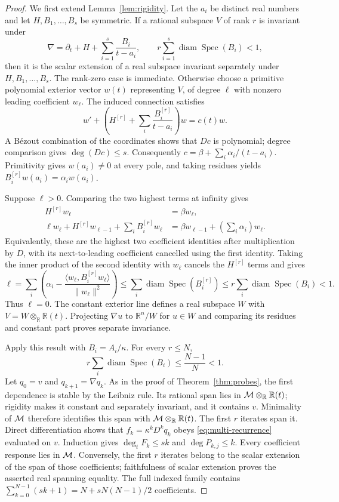 \documentclass[11pt,letterpaper]{article}
\theoremstyle{definition}\newtheorem{definition}[theorem]{Definition}
\theoremstyle{remark}\newtheorem{remark}[theorem]{Remark}
\DeclareMathOperator{\diam}{diam}\DeclareMathOperator{\Spec}{Spec}
\newcommand{\R}{\mathbb R}\newcommand{\Q}{\mathbb Q}\newcommand{\Z}{\mathbb Z}
\begin{document}
\begin{proof}
We first extend Lemma~\ref{lem:rigidity}. Let the $a_i$ be distinct real
numbers and let $H,B_1,\ldots,B_s$ be symmetric. If a rational subspace
$V$ of rank $r$ is invariant under
\[
\nabla=\partial_t+H+\sum_{i=1}^s\frac{B_i}{t-a_i},
\qquad r\sum_{i=1}^s\diam\Spec(B_i)<1,
\]
then it is the scalar extension of a real subspace invariant separately
under $H,B_1,\ldots,B_s$. The rank-zero case is immediate. Otherwise choose
a primitive polynomial exterior vector $w(t)$ representing $V$, of degree
$\ell$ with nonzero leading coefficient $w_\ell$. The induced connection
satisfies
\[
w'+\left(H^{[r]}+\sum_i\frac{B_i^{[r]}}{t-a_i}\right)w=c(t)w.
\]
A B\'ezout combination of the coordinates shows that $Dc$ is polynomial;
degree comparison gives $\deg(Dc)\le s$. Consequently
$c=\beta+\sum_i\alpha_i/(t-a_i)$. Primitivity gives $w(a_i)\ne0$ at every
pole, and taking residues yields
$B_i^{[r]}w(a_i)=\alpha_iw(a_i)$.

Suppose $\ell>0$. Comparing the two highest terms at infinity gives
\[
\begin{aligned}
H^{[r]}w_\ell&=\beta w_\ell,\\
\ell w_\ell+H^{[r]}w_{\ell-1}+\sum_iB_i^{[r]}w_\ell
 &=\beta w_{\ell-1}+\left(\sum_i\alpha_i\right)w_\ell.
\end{aligned}
\]
Equivalently, these are the highest two coefficient identities after
multiplication by $D$, with its next-to-leading coefficient cancelled
using the first identity. Taking the inner product of the second identity
with $w_\ell$ cancels the $H^{[r]}$ terms and gives
\[
\ell=\sum_i\left(\alpha_i-
 \frac{\langle w_\ell,B_i^{[r]}w_\ell\rangle}{\|w_\ell\|^2}\right)
\le\sum_i\diam\Spec(B_i^{[r]})
\le r\sum_i\diam\Spec(B_i)<1.
\]
Thus $\ell=0$. The constant exterior line defines a real subspace $W$
with $V=W\otimes_\R\R(t)$. Projecting $\nabla u$ to $\R^n/W$ for $u\in W$
and comparing its residues and constant part proves separate invariance.

Apply this result with $B_i=A_i/\kappa$. For every $r\le N$,
\[
r\sum_i\diam\Spec(B_i)\le\frac{N-1}{N}<1.
\]
Let $q_0=v$ and $q_{k+1}=\nabla q_k$. As in the proof of
Theorem~\ref{thm:probes}, the first dependence is stable by the Leibniz
rule. Its rational span lies in $\M\otimes_\R\R(t)$; rigidity makes it
constant and separately invariant, and it contains $v$. Minimality of
$\mathcal M$ therefore identifies this span with $\M\otimes_\R\R(t)$.
The first $r$ iterates span it. Direct differentiation shows that
$f_k=\kappa^kD^kq_k$ obeys \eqref{eq:multi-recurrence} evaluated on $v$.
Induction gives $\deg_t F_k\le sk$ and $\deg P_{k,j}\le k$.
Every coefficient response lies in $\mathcal M$. Conversely, the first $r$
iterates belong to the scalar extension of the span of those coefficients;
faithfulness of scalar extension proves the asserted real spanning equality.
The full indexed family contains
$\sum_{k=0}^{N-1}(sk+1)=N+sN(N-1)/2$ coefficients.


\end{proof}
\end{document}
